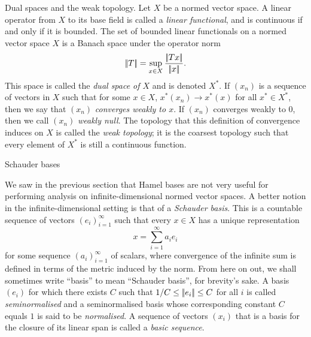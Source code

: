 \medskip\boldlabel Dual spaces and the weak topology.
Let $X$ be a normed vector space.
A linear operator from $X$ to its base field is called a {\it linear functional},
and is continuous if and only if it is bounded.
The set of bounded linear functionals on a normed vector space $X$ is a Banach space under the operator norm
$$|\!|T|\!| = \sup_{x\in X} {|\!|Tx|\!|\over |\!|x|\!|}.$$
This space is called the {\it dual space
of $X$} and is denoted $X^*$. If $(x_n)$ is a sequence of vectors in $X$ such that for some $x\in X$,
$x^*(x_n)\to x^*(x)$ for all $x^*\in X^*$, then we say that $(x_n)$ {\it converges weakly to $x$}.
If $(x_n)$ converges weakly to $0$, then we call $(x_n)$ {\it weakly null}. The topology that
this definition of convergence
induces on $X$ is called the {\it weak topology}; it is the coarsest topology such that every element
of $X^*$ is still a continuous function.
% 
% 

\advsect Schauder bases

We saw in the previous section that Hamel bases are not very useful for performing analysis on infinite-dimensional
normed vector spaces.
A better notion in the infinite-dimensional setting is that of a {\it Schauder basis}.
This is a countable sequence of vectors $(e_i)_{i=1}^\infty$
such that every $x\in X$ has a unique representation
$$x = \sum_{i=1}^\infty a_ie_i$$
for some sequence $(a_i)_{i=1}^\infty$ of scalars, where convergence of the infinite sum is defined in
terms of the metric induced by the norm. From here on out, we shall sometimes write ``basis'' to mean ``Schauder
basis'', for brevity's sake.
A basis $(e_i)$ for which there exists $C$ such that
$1/C \le |\!|e_i|\!| \le C$ for all $i$ is called {\it seminormalised} and a seminormalised basis
whose corresponding constant $C$ equals $1$ is said to be {\it normalised}.
A sequence of vectors $(x_i)$
that is a basis for the closure of its linear span is called a {\it basic sequence}.

